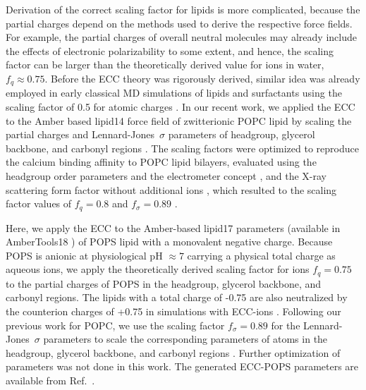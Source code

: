 \documentclass[journal=jctcce,manuscript=article]{achemso}
\begin{document}
Derivation of the correct scaling factor for lipids is more complicated, because
the partial charges depend on the methods used to derive the respective force fields.
For example, the partial charges of overall neutral molecules may already include the effects of electronic polarizability to some extent,
and hence, the scaling factor can be larger than the theoretically derived value for ions in water, $f_q \approx 0.75$.  
Before the ECC theory was rigorously derived, similar idea was already employed in early classical 
MD simulations of lipids and surfactants using the scaling factor of 0.5 for atomic charges  \cite{jonsson86,egberts94, berendsen1996}. 
In our recent work, we applied the ECC to the Amber based lipid14 force field of zwitterionic POPC lipid \cite{dickson14}
by scaling the partial charges and Lennard-Jones~$\sigma$ parameters of headgroup, glycerol backbone,
and carbonyl regions \cite{melcr18}. The scaling factors were optimized to reproduce 
the calcium binding affinity to POPC lipid bilayers, evaluated using the headgroup order parameters
and the electrometer concept \cite{akutsu81,altenbach84,seelig87,catte16}, and the X-ray scattering form factor
without additional ions \cite{kucerka11}, which resulted to the scaling factor values of $f_q = 0.8$ and $f_\sigma = 0.89$  \cite{melcr18}.

Here, we apply the ECC to the Amber-based lipid17 parameters \cite{lipid17-future} (available in AmberTools18 \cite{amber18})
of POPS lipid with a monovalent negative charge.
Because POPS is anionic at physiological pH $\approx 7$ carrying a physical total charge as aqueous ions, 
we apply the theoretically derived scaling factor\cite{leontyev09} for
ions $f_q = 0.75$ to the partial charges of POPS 
in the headgroup, glycerol backbone, and carbonyl regions. The lipids with a total charge of -0.75 are also neutralized
by the counterion charges of +0.75 in simulations with ECC-ions \cite{Pluharova2014, kohagen16, martinek17}.
Following our previous work for POPC, we use the scaling factor $f_\sigma = 0.89$ for the Lennard-Jones~$\sigma$ parameters 
to scale the corresponding parameters of atoms 
in the headgroup, glycerol backbone, and carbonyl regions \cite{melcr18}. 
Further optimization of parameters was not done in this work. 
The generated ECC-POPS parameters are available from Ref.~. 
\end{document}
